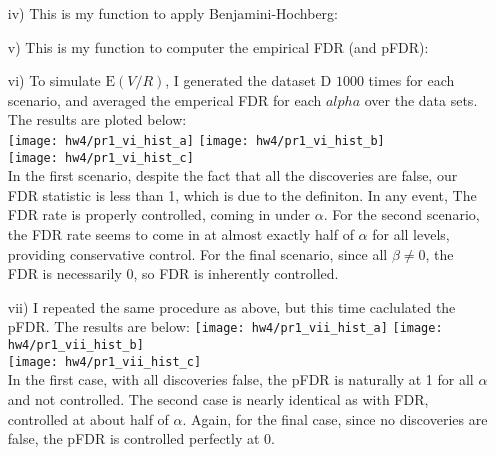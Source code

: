 \documentclass[11pt]{article}
\newcommand{\E}{\mathrm{E}}
\theoremstyle{definition}
\begin{document}
\begin{itemize}
\begin{itemize}
            \item[iv)] This is my function to apply Benjamini-Hochberg:
                
            \item[v)] This is my function to computer the empirical FDR (and pFDR):
                
            \item[vi)]
                To simulate $\E(V/R)$, I generated the dataset D $1000$ times for each scenario, and averaged the emperical FDR for each $alpha$ over the data sets. The results are ploted below: \\
                \texttt{[image: hw4/pr1\_vi\_hist\_a]}
                \texttt{[image: hw4/pr1\_vi\_hist\_b]} \\
                \texttt{[image: hw4/pr1\_vi\_hist\_c]} \\
                In the first scenario, despite the fact that all the discoveries are false, our FDR statistic is less than 1, which is due to the definiton. In any event, The FDR rate is properly controlled, coming in under $\alpha$. For the second scenario, the FDR rate seems to come in at almost exactly half of $\alpha$ for all levels, providing conservative control. For the final scenario, since all $\beta\neq0$, the FDR is necessarily $0$, so FDR is inherently controlled.  
            \item[vii)] I repeated the same procedure as above, but this time caclulated the pFDR. The results are below:
                \texttt{[image: hw4/pr1\_vii\_hist\_a]}
                \texttt{[image: hw4/pr1\_vii\_hist\_b]} \\
                \texttt{[image: hw4/pr1\_vii\_hist\_c]} \\
                In the first case, with all discoveries false, the pFDR is naturally at 1 for all $\alpha$ and not controlled. The second case is nearly identical as with FDR, controlled at about half of $\alpha$. Again, for the final case, since no discoveries are false, the pFDR is controlled perfectly at 0.



        \end{itemize}
\end{itemize}
\end{document}
